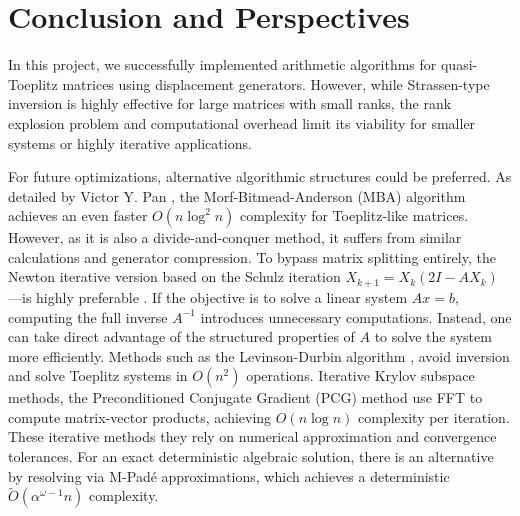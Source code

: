\section{Conclusion and Perspectives}

In this project, we successfully implemented
arithmetic algorithms for quasi-Toeplitz matrices using displacement
generators. However, while Strassen-type inversion is highly
effective for large matrices with small ranks, the rank explosion
problem and computational overhead limit its viability for smaller
systems or highly iterative applications.

For future optimizations, alternative algorithmic structures could be
preferred. As detailed by Victor Y. Pan \cite[Chapter
5]{pan2001structured}, the Morf-Bitmead-Anderson (MBA) algorithm
achieves an even faster $O(n \log^2 n)$ complexity for
Toeplitz-like matrices. However, as it is also a divide-and-conquer
method, it suffers from similar calculations and
generator compression. To bypass matrix splitting
entirely, the Newton iterative version based on the Schulz iteration
$X_{k+1} = X_k(2I - A X_k)$—is highly preferable \cite[Chapters 6 and
7]{pan2001structured}. If the objective is to solve a linear system
$Ax = b$, computing the
full inverse $A^{-1}$ introduces unnecessary computations.
Instead, one can take direct advantage of the structured properties
of $A$ to solve the system more efficiently.
Methods such as the Levinson-Durbin algorithm
\cite{durbin1960fitting}, avoid inversion and solve Toeplitz systems
in $O(n^2)$ operations.
Iterative Krylov subspace methods, the Preconditioned Conjugate
Gradient (PCG) method \cite{doi:10.1137/0909051} use FFT to compute
matrix-vector products, achieving $O(n \log n)$ complexity per iteration.
These iterative methods they rely on numerical approximation and
convergence tolerances.
For an exact deterministic algebraic solution, there is an
alternative by resolving via M-Padé
approximations\cite{khichane2026matricesdisplacementstructuredeterministic},
which achieves a deterministic $\tilde{O}(\alpha^{\omega-1}n)$ complexity.
